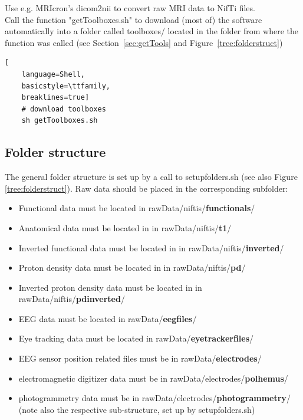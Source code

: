 \documentclass[12pt,a4paper]{scrartcl}
\begin{document}
\noindent Use e.g. MRIcron's dicom2nii to convert raw MRI data to NifTi files.\\

\noindent Call the function "getToolboxes.sh" to download (most of) the software automatically into a folder called toolboxes/ located in the folder from where the function was called (see Section~\ref{sec:getTools} and Figure~\ref{tree:folderstruct})\\
\begin{lstlisting}[
    language=Shell,
    basicstyle=\ttfamily,
    breaklines=true]
    # download toolboxes
    sh getToolboxes.sh
\end{lstlisting}

\subsection{Folder structure}
\label{sec:dirstruct}
The general folder structure is set up by a call to setupfolders.sh (see also Figure \ref{tree:folderstruct}). Raw data should be placed in the corresponding subfolder:
\begin{itemize}
\item Functional data must be located in rawData/niftis/\textbf{functionals}/
\item Anatomical data must be located in in rawData/niftis/\textbf{t1}/
\item Inverted functional data must be located in in rawData/niftis/\textbf{inverted}/
\item Proton density data must be located in in rawData/niftis/\textbf{pd}/
\item Inverted proton density data must be located in in rawData/niftis/\textbf{pdinverted}/
\item EEG data must be located in rawData/\textbf{eegfiles}/
\item Eye tracking data must be located in rawData/\textbf{eyetrackerfiles}/
\item EEG sensor position related files must be in rawData/\textbf{electrodes}/
\item electromagnetic digitizer data must be in rawData/electrodes/\textbf{polhemus}/
\item photogrammetry data must be in rawData/electrodes/\textbf{photogrammetry}/ (note also the respective sub-structure, set up by setupfolders.sh)
\end{itemize}
\end{document}

